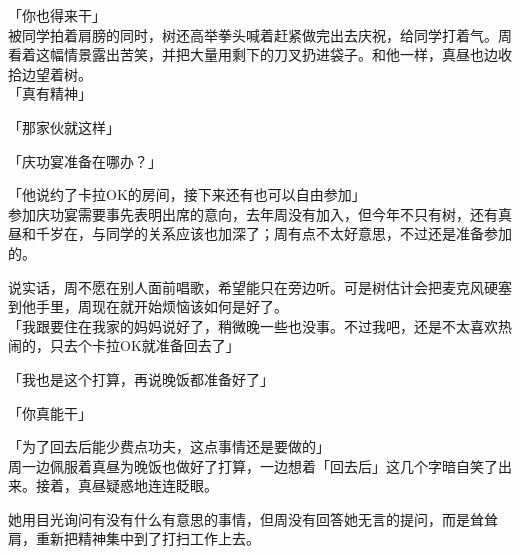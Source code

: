 「你也得来干」\\

被同学拍着肩膀的同时，树还高举拳头喊着赶紧做完出去庆祝，给同学打着气。周看着这幅情景露出苦笑，并把大量用剩下的刀叉扔进袋子。和他一样，真昼也边收拾边望着树。\\

「真有精神」

「那家伙就这样」

「庆功宴准备在哪办？」

「他说约了卡拉OK的房间，接下来还有也可以自由参加」\\

参加庆功宴需要事先表明出席的意向，去年周没有加入，但今年不只有树，还有真昼和千岁在，与同学的关系应该也加深了；周有点不太好意思，不过还是准备参加的。

说实话，周不愿在别人面前唱歌，希望能只在旁边听。可是树估计会把麦克风硬塞到他手里，周现在就开始烦恼该如何是好了。\\

「我跟要住在我家的妈妈说好了，稍微晚一些也没事。不过我吧，还是不太喜欢热闹的，只去个卡拉OK就准备回去了」

「我也是这个打算，再说晚饭都准备好了」

「你真能干」

「为了回去后能少费点功夫，这点事情还是要做的」\\

周一边佩服着真昼为晚饭也做好了打算，一边想着「回去后」这几个字暗自笑了出来。接着，真昼疑惑地连连眨眼。

她用目光询问有没有什么有意思的事情，但周没有回答她无言的提问，而是耸耸肩，重新把精神集中到了打扫工作上去。
